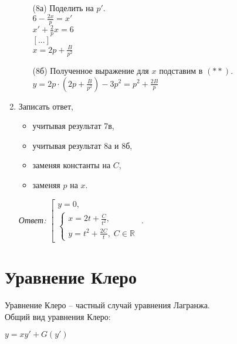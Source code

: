 \documentclass[10pt, a4paper]{article}
\begin{document}
\begin{enumerate}
        \begin{enumerate}
            \item[(8а)] Поделить на $p'$. \\
                  $6 - \frac{2x}{p} = x'$ \\
                  $x' + \frac{2}{p}x = 6$ \\
                  $[...]$ \\
                  $x = 2p + \frac{B}{p^2}$
            \item[(8б)] Полученное выражение для $x$ подставим в $(**)$. \\
                  $y = 2p  \cdot  (2p + \frac{B}{p^2}) - 3p^2 = p^2 + \frac{2B}{p}$
        \end{enumerate}
    \item Записать ответ,
        \begin{itemize}
            \item учитывая результат 7в,
            \item учитывая результат 8а и 8б,
            \item заменяя константы на $C$,
            \item заменяя $p$ на $x$.
        \end{itemize}
        \par\textit{Ответ:}
              $\left[
                  \begin{gathered}
                      y = 0, \\
                      \begin{cases}
                          x = 2t + \frac{C}{t^2}, \\
                          y = t^2 + \frac{2C}{t},\;C \in \mathbb{R}
                      \end{cases}
                  \end{gathered}
              \right.$.
\end{enumerate}

\section{Уравнение Клеро}
Уравнение Клеро -- частный случай уравнения Лагранжа. \\
Общий вид уравнения Клеро:
\par $y = xy' + G(y')$
\end{document}
